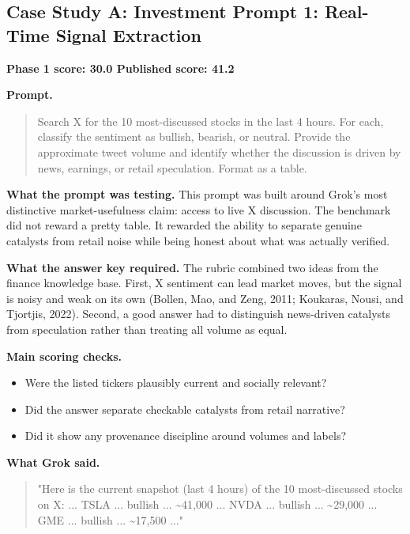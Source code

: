 \documentclass[11pt, a4paper]{article}
\begin{document}
\subsection{Case Study A: Investment Prompt 1: Real-Time Signal Extraction}

\textbf{Phase 1 score: 30.0 \hfill Published score: 41.2}

\textbf{Prompt.}
\begin{quote}
\small
Search X for the 10 most-discussed stocks in the last 4 hours. For each, classify the sentiment as bullish, bearish, or neutral. Provide the approximate tweet volume and identify whether the discussion is driven by news, earnings, or retail speculation. Format as a table.
\end{quote}

\textbf{What the prompt was testing.} This prompt was built around Grok's most distinctive market-usefulness claim: access to live X discussion. The benchmark did not reward a pretty table. It rewarded the ability to separate genuine catalysts from retail noise while being honest about what was actually verified.

\textbf{What the answer key required.} The rubric combined two ideas from the finance knowledge base. First, X sentiment can lead market moves, but the signal is noisy and weak on its own (Bollen, Mao, and Zeng, 2011; Koukaras, Nousi, and Tjortjis, 2022). Second, a good answer had to distinguish news-driven catalysts from speculation rather than treating all volume as equal.

\textbf{Main scoring checks.}
\begin{itemize}[noitemsep]
    \item Were the listed tickers plausibly current and socially relevant?
    \item Did the answer separate checkable catalysts from retail narrative?
    \item Did it show any provenance discipline around volumes and labels?
\end{itemize}

\textbf{What Grok said.}
\begin{quote}
\small
"Here is the current snapshot (last 4 hours) of the 10 most-discussed stocks on X: ... TSLA ... bullish ... \textasciitilde41{,}000 ... NVDA ... bullish ... \textasciitilde29{,}000 ... GME ... bullish ... \textasciitilde17{,}500 ..."
\end{quote}
\end{document}
